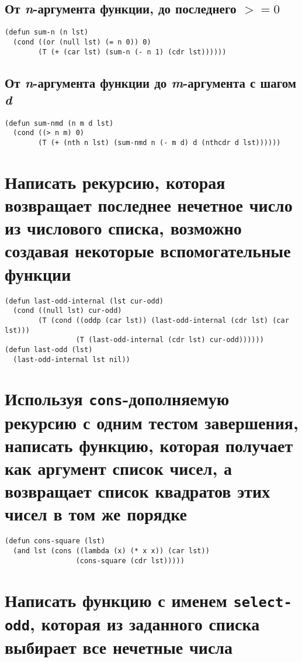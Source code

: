 \subsection{От \textit{n}-аргумента функции, до последнего $>= 0$}

\begin{lstlisting}
(defun sum-n (n lst)
  (cond ((or (null lst) (= n 0)) 0)
        (T (+ (car lst) (sum-n (- n 1) (cdr lst))))))
\end{lstlisting}

\subsection{От \textit{n}-аргумента функции до \textit{m}-аргумента с шагом \textit{d}}

\begin{lstlisting}
(defun sum-nmd (n m d lst)
  (cond ((> n m) 0)
        (T (+ (nth n lst) (sum-nmd n (- m d) d (nthcdr d lst))))))
\end{lstlisting}

\section{Написать рекурсию, которая возвращает последнее нечетное число из числового списка, возможно создавая некоторые вспомогательные функции}

\begin{lstlisting}
(defun last-odd-internal (lst cur-odd)
  (cond ((null lst) cur-odd)
        (T (cond ((oddp (car lst)) (last-odd-internal (cdr lst) (car lst)))
                 (T (last-odd-internal (cdr lst) cur-odd))))))
(defun last-odd (lst)
  (last-odd-internal lst nil))
\end{lstlisting}

\section{Используя \texttt{cons}-дополняемую рекурсию с одним тестом завершения, написать функцию, которая получает как аргумент список чисел, а возвращает список квадратов этих чисел в том же порядке}

\begin{lstlisting}
(defun cons-square (lst)
  (and lst (cons ((lambda (x) (* x x)) (car lst))
                 (cons-square (cdr lst)))))
\end{lstlisting}

\section{Написать функцию с именем \texttt{select-odd}, которая из заданного списка выбирает все нечетные числа}

